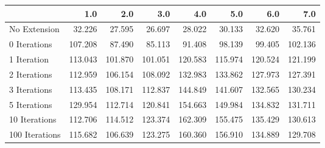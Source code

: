 \begin{tabular}{lrrrrrrr}
\toprule
{} &     1.0 &     2.0 &     3.0 &     4.0 &     5.0 &     6.0 &     7.0 \\
\midrule
No Extension   &  32.226 &  27.595 &  26.697 &  28.022 &  30.133 &  32.620 &  35.761 \\
0 Iterations   & 107.208 &  87.490 &  85.113 &  91.408 &  98.139 &  99.405 & 102.136 \\
1 Iteration    & 113.043 & 101.870 & 101.051 & 120.583 & 115.974 & 120.524 & 121.199 \\
2 Iterations   & 112.959 & 106.154 & 108.092 & 132.983 & 133.862 & 127.973 & 127.391 \\
3 Iterations   & 113.435 & 108.171 & 112.837 & 144.849 & 141.607 & 132.565 & 130.234 \\
5 Iterations   & 129.954 & 112.714 & 120.841 & 154.663 & 149.984 & 134.832 & 131.711 \\
10 Iterations  & 112.706 & 114.512 & 123.374 & 162.309 & 155.475 & 135.429 & 130.613 \\
100 Iterations & 115.682 & 106.639 & 123.275 & 160.360 & 156.910 & 134.889 & 129.708 \\
\bottomrule
\end{tabular}
